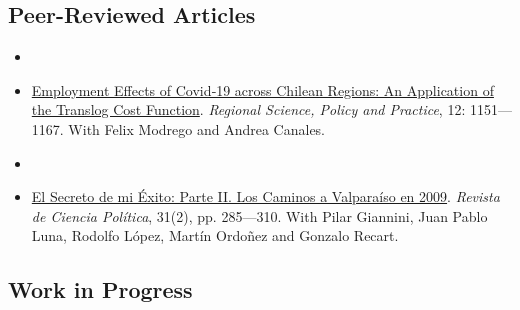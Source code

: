 \subsection*{Peer-Reviewed Articles}


\begin{itemize}

	\item[\textcolor{gray}{\textbullet}] \unskip

	\item[\textcolor{gray}{\textbullet}] \href{https://doi.org/10.1111/rsp3.12337}{Employment Effects of Covid‐19 across Chilean Regions: An Application of the Translog Cost Function}. \emph{Regional Science, Policy and Practice}, 12: 1151---1167. With Felix Modrego and Andrea Canales.

	\item[\textcolor{gray}{\textbullet}] \unskip

	\item[\textcolor{gray}{\textbullet}] \href{https://scielo.conicyt.cl/pdf/revcipol/v31n2/art07.pdf}{El Secreto de mi \'Exito: Parte II. Los Caminos a Valpara\'iso en 2009}. \emph{Revista de Ciencia Pol\'itica}, 31(2), pp. 285---310. With Pilar Giannini, Juan Pablo Luna, Rodolfo L\'opez, Mart\'in Ordo\~nez and Gonzalo Recart.
  
\end{itemize}



\subsection*{Work in Progress}


